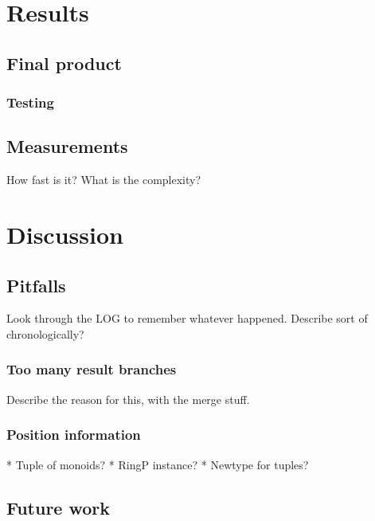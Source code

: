 \documentclass[a4paper,12pt,twosided]{report}
\begin{document}
%
%

\chapter{Results}

\section{Final product}
\subsection{Testing}

\section{Measurements}
How fast is it? What is the complexity?

%
%
\chapter{Discussion}

\section{Pitfalls}
Look through the LOG to remember whatever happened. Describe sort of chronologically?

\subsection{Too many result branches}
Describe the reason for this, with the merge stuff.

\subsection{Position information}
* Tuple of monoids?
* RingP instance?
* Newtype for tuples?

\section{Future work}

%
%




%
%
\end{document}
